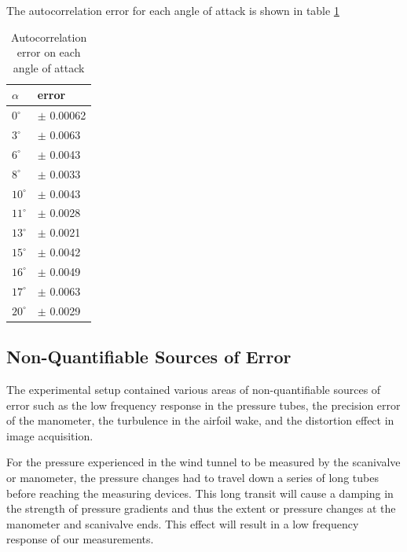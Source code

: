\documentclass[runningheads]{llncs}
\begin{document}
The autocorrelation error for each angle of attack is shown in table \ref{tab:auto_err}
\newline
\begin{table}[h]
\centering
\begin{tabular}{||l|l||}
\toprule
$\alpha$ & error\\
\midrule
$0^\circ$ & $\pm$ 0.00062 \\
$3^\circ$ & $\pm$ 0.0063 \\
$6^\circ$ & $\pm$ 0.0043\\
$8^\circ$ & $\pm$ 0.0033 \\
$10^\circ$ & $\pm$ 0.0043	\\
$11^\circ$ & $\pm$ 0.0028 \\
$13^\circ$ & $\pm$ 0.0021 \\
$15^\circ$ & $\pm$ 0.0042 \\
$16^\circ$ & $\pm$ 0.0049 \\
$17^\circ$ & $\pm$ 0.0063	\\
$20^\circ$ & $\pm$ 0.0029\\
\bottomrule
\end{tabular}
\caption{Autocorrelation error on each angle of attack}
\label{tab:auto_err}
\end{table}

\subsection{Non-Quantifiable Sources of Error}
\label{sec:non_quantifiable_sources_of_error}

\noindent
The experimental setup contained various areas of non-quantifiable sources of error such as the low frequency response in the pressure tubes, the precision error of the manometer, the turbulence in the airfoil wake, and the distortion effect in image acquisition.\newline

\noindent
For the pressure experienced in the wind tunnel to be measured by the scanivalve or manometer, the pressure changes had to travel down a series of long tubes before reaching the measuring devices. This long transit will cause a damping in the strength of pressure gradients and thus the extent or pressure changes at the manometer and scanivalve ends. This effect will result in a low frequency response of our measurements.\newline
\end{document}
